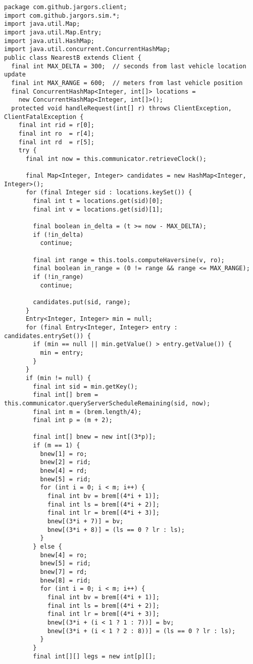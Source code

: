 {
\small
\begin{verbatim}
package com.github.jargors.client;
import com.github.jargors.sim.*;
import java.util.Map;
import java.util.Map.Entry;
import java.util.HashMap;
import java.util.concurrent.ConcurrentHashMap;
public class NearestB extends Client {
  final int MAX_DELTA = 300;  // seconds from last vehicle location update
  final int MAX_RANGE = 600;  // meters from last vehicle position
  final ConcurrentHashMap<Integer, int[]> locations =
    new ConcurrentHashMap<Integer, int[]>();
  protected void handleRequest(int[] r) throws ClientException, ClientFatalException {
    final int rid = r[0];
    final int ro  = r[4];
    final int rd  = r[5];
    try {
      final int now = this.communicator.retrieveClock();

      final Map<Integer, Integer> candidates = new HashMap<Integer, Integer>();
      for (final Integer sid : locations.keySet()) {
        final int t = locations.get(sid)[0];
        final int v = locations.get(sid)[1];

        final boolean in_delta = (t >= now - MAX_DELTA);
        if (!in_delta)
          continue;

        final int range = this.tools.computeHaversine(v, ro);
        final boolean in_range = (0 != range && range <= MAX_RANGE);
        if (!in_range)
          continue;

        candidates.put(sid, range);
      }
      Entry<Integer, Integer> min = null;
      for (final Entry<Integer, Integer> entry : candidates.entrySet()) {
        if (min == null || min.getValue() > entry.getValue()) {
          min = entry;
        }
      }
      if (min != null) {
        final int sid = min.getKey();
        final int[] brem = this.communicator.queryServerScheduleRemaining(sid, now);
        final int m = (brem.length/4);
        final int p = (m + 2);

        final int[] bnew = new int[(3*p)];
        if (m == 1) {
          bnew[1] = ro;
          bnew[2] = rid;
          bnew[4] = rd;
          bnew[5] = rid;
          for (int i = 0; i < m; i++) {
            final int bv = brem[(4*i + 1)];
            final int ls = brem[(4*i + 2)];
            final int lr = brem[(4*i + 3)];
            bnew[(3*i + 7)] = bv;
            bnew[(3*i + 8)] = (ls == 0 ? lr : ls);
          }
        } else {
          bnew[4] = ro;
          bnew[5] = rid;
          bnew[7] = rd;
          bnew[8] = rid;
          for (int i = 0; i < m; i++) {
            final int bv = brem[(4*i + 1)];
            final int ls = brem[(4*i + 2)];
            final int lr = brem[(4*i + 3)];
            bnew[(3*i + (i < 1 ? 1 : 7))] = bv;
            bnew[(3*i + (i < 1 ? 2 : 8))] = (ls == 0 ? lr : ls);
          }
        }
        final int[][] legs = new int[p][];


\end{verbatim}}
